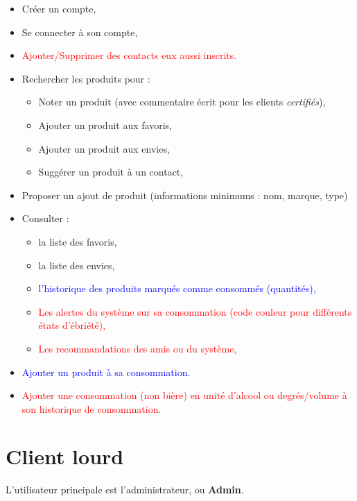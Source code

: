 \documentclass[a4paper,12pt,twoside]{article}
\begin{document}
\begin{itemize}
 \item Créer un compte, 
 \item Se connecter à son compte, 
 \item \textcolor{red}{Ajouter/Supprimer des contacts eux aussi inscrits.}
 \item Rechercher les produits pour : 
 	\begin{itemize}
 	 \item Noter un produit (avec commentaire écrit pour les clients \textit{certifiés}),
 	 \item Ajouter un produit aux favoris, 
 	 \item Ajouter un produit aux envies,
 	 \item Suggérer un produit à un contact,
 	\end{itemize}
 \item Proposer un ajout de produit (informations minimums : nom, marque, type)
 \item Consulter : 
 	\begin{itemize}
 	 \item la liste des favoris, 
 	 \item la liste des envies, 
 	 \item \textcolor{blue}{l'historique des produits marqués comme consommés (quantités),} 
 	 \item \textcolor{red}{Les alertes du système sur sa consommation (code couleur pour différents états d'ébriété),}
 	 \item \textcolor{red}{Les recommandations des amis ou du système,}
 	\end{itemize}
 \item \textcolor{blue}{Ajouter un produit à sa consommation.}
 \item \textcolor{red}{Ajouter une consommation (non bière) en unité d'alcool ou degrés/volume à son historique de consommation.}
\end{itemize}

\section{Client lourd}

L'utilisateur principale est l'administrateur, ou \textbf{Admin}. \\
\end{document}
